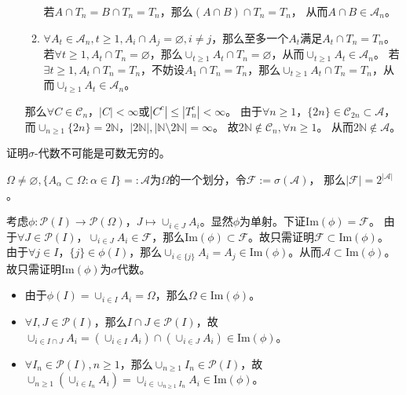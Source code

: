 \documentclass{ctexart}
\begin{document}
\begin{solution}
\begin{enumerate}
\begin{enumerate}
        若\(A \cap T_n = B \cap T_n = T_n \)，那么\((A \cap B)\cap T_n =T_n \)， 从而\(A \cap B \in \mathcal{A}_n \)。
      \item \(\forall A_t \in \mathcal{A}_n, t \geq 1, A_i \cap A_j = \varnothing , i \neq j\)，那么至多一个\(A_t \)满足\(A_t \cap T_n =T_n \)。 
        若\(\forall t \geq 1, A_t \cap T_n = \varnothing \)，那么\(\cup_{t \geq 1}A_t \cap T_n =\varnothing \)，从而\(\cup_{t \geq 1} A_t \in \mathcal{A}_n \)。
        若\(\exists t \geq 1 , A_t \cap T_n = T_n\)，不妨设\(A_1 \cap T_n =T_n \)，那么\(\cup_{t \geq 1} A_t \cap T_n =T_n \)，从而\(\cup_{t \geq 1} A_t \in \mathcal{A}_n \)。
    \end{enumerate}
    那么\(\forall C \in \mathcal{C}_n \)，\(|C |< \infty \)或\(|C^c| \leq |T_n^c| <\infty \)。
    由于\(\forall n \geq 1 \)，\(\{2n\} \in \mathcal{C}_{2n} \subset \mathcal{A} \)，而\(\cup_{n \geq 1} \{2n\} =2\mathbb{N} \)，\(|2\mathbb{N}|,|\mathbb{N} \setminus 2\mathbb{N}| = \infty \)。
    故\(2\mathbb{N} \notin \mathcal{C}_n, \forall n \geq 1  \)。 从而\(2\mathbb{N} \notin \mathcal{A} \)。
\end{enumerate}
\end{solution}

\begin{problem} 
  证明\(\sigma \)-代数不可能是可数无穷的。
\end{problem}
\begin{lemma}\label{lem:atom}
  \(\Omega \neq \varnothing,\{A_{\alpha} \subset \Omega:\alpha \in I\}=:\mathcal{A} \)为\(\Omega \)的一个划分，令\(\mathcal{F}:=\sigma(\mathcal{A}) \)，
  那么\(|\mathcal{F}|=2^{|\mathcal{A}|} \)。
\end{lemma}
\begin{solution}
  考虑\(\phi:\mathcal{P}(I) \to \mathcal{P}(\Omega) \)，\(J \mapsto \cup_{i \in J} A_i \)。显然\(\phi \)为单射。下证\(\mathrm{Im}(\phi) = \mathcal{F} \)。
  由于\(\forall J \in \mathcal{P}(I) \)，\(\cup_{i \in J}A_i \in \mathcal{F} \)，那么\(\mathrm{Im}(\phi) \subset \mathcal{F} \)。故只需证明\(\mathcal{F} \subset \mathrm{Im}(\phi) \)。
  由于\(\forall j \in I \)，\(\{j\} \in \phi(I) \)，那么\(\cup_{i \in \{j\}}A_i=A_j \in \mathrm{Im}(\phi) \)。从而\(\mathcal{A} \subset \mathrm{Im}(\phi) \)。
  故只需证明\(\mathrm{Im}(\phi) \)为\(\sigma \)代数。
  \begin{itemize}
    \item 由于\(\phi(I)=\cup_{i \in I} A_i =\Omega \)，那么\(\Omega \in \mathrm{Im}(\phi) \)。
    \item \(\forall I,J \in \mathcal{P}(I) \)，那么\(I \cap J \in \mathcal{P}(I) \)，故\(\cup_{i \in I \cap J} A_i = (\cup_{i \in I}A_i) \cap (\cup_{i \in J}A_i) \in \mathrm{Im}(\phi) \)。
    \item \(\forall I_n \in \mathcal{P}(I), n \geq 1 \)，那么\( \cup_{n \geq 1} I_n \in \mathcal{P}(I)\)，故\(\cup_{n \geq 1}(\cup_{i \in I_n} A_i )= \cup_{i \in \cup_{n \geq 1}I_n}A_i \in \mathrm{Im}(\phi)\)。
  \end{itemize}
\end{solution}
\end{document}
